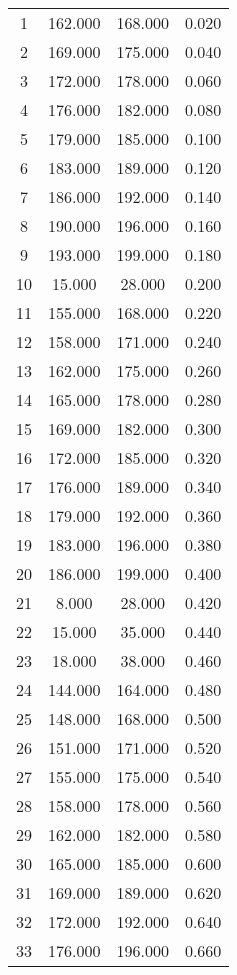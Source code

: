 % 
\begin{tabular}{cccc}
  \hline
  \hline
1 & 162.000 & 168.000 & 0.020 \\ 
  2 & 169.000 & 175.000 & 0.040 \\ 
  3 & 172.000 & 178.000 & 0.060 \\ 
  4 & 176.000 & 182.000 & 0.080 \\ 
  5 & 179.000 & 185.000 & 0.100 \\ 
  6 & 183.000 & 189.000 & 0.120 \\ 
  7 & 186.000 & 192.000 & 0.140 \\ 
  8 & 190.000 & 196.000 & 0.160 \\ 
  9 & 193.000 & 199.000 & 0.180 \\ 
  10 & 15.000 & 28.000 & 0.200 \\ 
  11 & 155.000 & 168.000 & 0.220 \\ 
  12 & 158.000 & 171.000 & 0.240 \\ 
  13 & 162.000 & 175.000 & 0.260 \\ 
  14 & 165.000 & 178.000 & 0.280 \\ 
  15 & 169.000 & 182.000 & 0.300 \\ 
  16 & 172.000 & 185.000 & 0.320 \\ 
  17 & 176.000 & 189.000 & 0.340 \\ 
  18 & 179.000 & 192.000 & 0.360 \\ 
  19 & 183.000 & 196.000 & 0.380 \\ 
  20 & 186.000 & 199.000 & 0.400 \\ 
  21 & 8.000 & 28.000 & 0.420 \\ 
  22 & 15.000 & 35.000 & 0.440 \\ 
  23 & 18.000 & 38.000 & 0.460 \\ 
  24 & 144.000 & 164.000 & 0.480 \\ 
  25 & 148.000 & 168.000 & 0.500 \\ 
  26 & 151.000 & 171.000 & 0.520 \\ 
  27 & 155.000 & 175.000 & 0.540 \\ 
  28 & 158.000 & 178.000 & 0.560 \\ 
  29 & 162.000 & 182.000 & 0.580 \\ 
  30 & 165.000 & 185.000 & 0.600 \\ 
  31 & 169.000 & 189.000 & 0.620 \\ 
  32 & 172.000 & 192.000 & 0.640 \\ 
  33 & 176.000 & 196.000 & 0.660 \\ 

\end{tabular}
